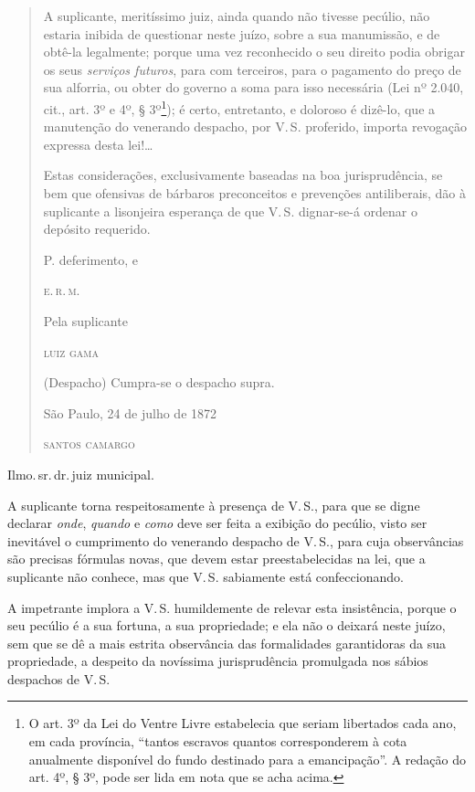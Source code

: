 \begin{quote}
A suplicante, meritíssimo juiz, ainda quando não tivesse pecúlio, não
estaria inibida de questionar neste juízo, sobre a sua manumissão, e de
obtê-la legalmente; porque uma vez reconhecido o seu direito podia
obrigar os seus \emph{serviços futuros}, para com terceiros, para o
pagamento do preço de sua alforria, ou obter do governo a soma para isso
necessária (Lei nº 2.040, cit., art. 3º e 4º, § 3º\footnote{ O art. 3º
  da Lei do Ventre Livre estabelecia que seriam libertados cada ano, em
  cada província, ``tantos escravos quantos corresponderem à cota
  anualmente disponível do fundo destinado para a emancipação''. A
  redação do art. 4º, § 3º, pode ser lida em nota que se acha acima.});
é certo, entretanto, e doloroso é dizê-lo, que a manutenção do venerando
despacho, por V.\,S. proferido, importa revogação expressa desta lei!\ldots{}

Estas considerações, exclusivamente baseadas na boa jurisprudência, se
bem que ofensivas de bárbaros preconceitos e prevenções antiliberais,
dão à suplicante a lisonjeira esperança de que V.\,S. dignar-se-á ordenar
o depósito requerido.

\begin{flushright}
P. deferimento, e

\textsc{e.\,r.\,m.}

Pela suplicante

\textsc{luiz gama}
\end{flushright}

(Despacho) Cumpra-se o despacho supra.

\begin{flushright}
São Paulo, 24 de julho de 1872

\textsc{santos camargo}
\end{flushright}
\end{quote}

\asterisc

Ilmo.\,sr.\,dr.\,juiz municipal.

A suplicante torna respeitosamente à presença de V.\,S., para que se
digne declarar \emph{onde}, \emph{quando} e \emph{como} deve ser feita a
exibição do pecúlio, visto ser inevitável o cumprimento do venerando
despacho de V.\,S., para cuja observâncias são precisas fórmulas novas,
que devem estar preestabelecidas na lei, que a suplicante não conhece,
mas que V.\,S. sabiamente está confeccionando.

A impetrante implora a V.\,S. humildemente de relevar esta insistência,
porque o seu pecúlio é a sua fortuna, a sua propriedade; e ela não o
deixará neste juízo, sem que se dê a mais estrita observância das
formalidades garantidoras da sua propriedade, a despeito da novíssima
jurisprudência promulgada nos sábios despachos de V.\,S.

